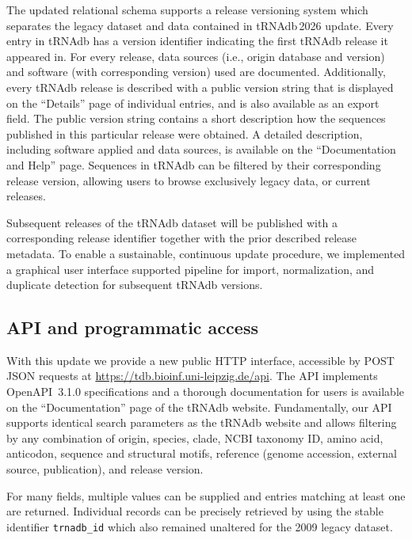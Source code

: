 \documentclass[unnumsec,webpdf,contemporary,large]{oup-authoring-template}
\begin{document}
The updated relational schema supports a release versioning system which
separates the legacy dataset and data contained in tRNAdb\,2026
update. Every entry in tRNAdb has a version identifier indicating the first
tRNAdb release it appeared in. For every release, data sources (i.e.,
origin database and version) and software (with corresponding version) used
are documented. Additionally, every tRNAdb release is described with a
public version string that is displayed on the ``Details'' page of
individual entries, and is also available as an export field. The public
version string contains a short description how the sequences published in
this particular release were obtained. A detailed description, including
software applied and data sources, is available on the ``Documentation and
Help'' page.  Sequences in tRNAdb can be filtered by their corresponding
release version, allowing users to browse exclusively legacy data, or
current releases.

Subsequent releases of the tRNAdb dataset will be published with a
corresponding release identifier together with the prior described release
metadata. To enable a sustainable, {continuous} update procedure, we implemented a graphical user interface supported pipeline for import, normalization, and duplicate detection for subsequent tRNAdb versions.

\subsection{API and programmatic access}

With this update we provide a new public HTTP interface, accessible by POST
JSON requests at \url{https://tdb.bioinf.uni-leipzig.de/api}. The API
implements OpenAPI~3.1.0 specifications and a thorough documentation for
users is available on the ``Documentation'' page of the tRNAdb
website. Fundamentally, our API supports identical search parameters as the
tRNAdb website and allows filtering by any combination of origin, species,
clade, NCBI taxonomy ID, amino acid, anticodon, sequence and structural
motifs, reference (genome accession, external source, publication), and
release version.

For many fields, multiple values can be supplied and entries matching at
least one are returned. Individual records can be precisely retrieved by
using the stable identifier \texttt{trnadb\_id} which also remained
unaltered for the 2009 legacy dataset.
\end{document}

